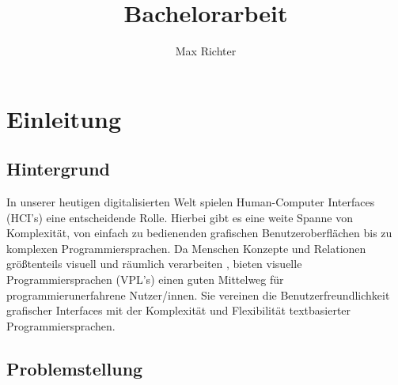 \documentclass[ngerman]{article}
\title{Bachelorarbeit}
\author{Max Richter}
\begin{document}
\pagestyle{fancy}
\fancyhead{} %
\fancyfoot{} %
\fancyfoot[LE,RO]{\thepage}

\raggedright

\maketitle
\pagebreak

\tableofcontents

\pagebreak

\section{Einleitung}

\subsection{Hintergrund}
In unserer heutigen digitalisierten Welt spielen Human-Computer Interfaces (HCI's) eine entscheidende Rolle.
Hierbei gibt es eine weite Spanne von Komplexität, von einfach zu bedienenden grafischen Benutzeroberflächen bis zu komplexen Programmiersprachen. 
\br
Da Menschen Konzepte und Relationen größtenteils visuell und räumlich verarbeiten \cite{smith1975pygmalion}, bieten visuelle Programmiersprachen (VPL's) einen guten Mittelweg für programmierunerfahrene Nutzer/innen. 
Sie vereinen die Benutzerfreundlichkeit grafischer Interfaces mit der Komplexität und Flexibilität textbasierter Programmiersprachen.

\subsection{Problemstellung}
\end{document}
